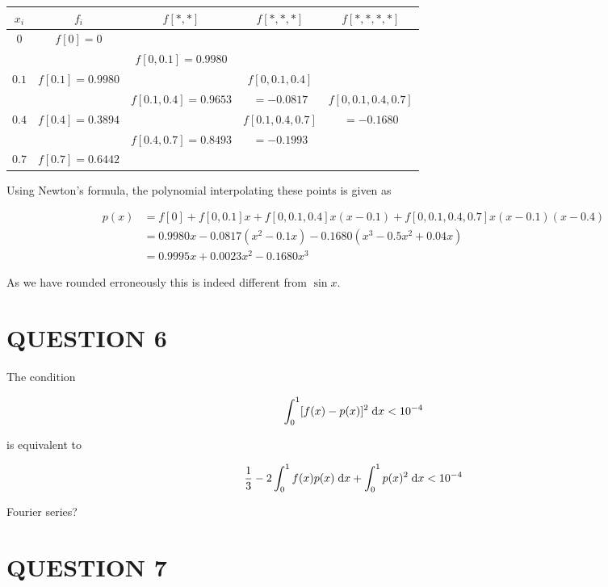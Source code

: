 \documentclass[a4paper]{article}
\begin{document}
\begin{center}
	\begin{tabular}{ccccc}
		\toprule
		$x_i$ & $f_i$ & $f[*, *]$ & $f[*, *, *]$ & $f[*,*,*,*]$\\
		\midrule
		$0$ & $f[0] = 0$\\
		& & $f[0, 0.1] = 0.9980$\\
		$0.1$ & $f[0.1] = 0.9980$ & & $f[0, 0.1, 0.4] $ \\
		& & $f[0.1, 0.4] = 0.9653 $ & $ = -0.0817 $ & $f[0,0.1,0.4,0.7] $ \\
		$0.4$ & $f[0.4] = 0.3894$ & & $f[0.1, 0.4, 0.7] $ & $ = - 0.1680 $  \\
		& & $f[0.4, 0.7] = 0.8493$ & $ = -0.1993 $ \\
		$0.7$ & $f[0.7] = 0.6442$ & \\
		\bottomrule
	\end{tabular}
\end{center}

Using Newton's formula, the polynomial interpolating these points is given as

\begin{align*}
p(x) & = f[0] + f[0,0.1]x + f[0,0.1,0.4]x(x-0.1) + f[0,0.1,0.4,0.7]x(x-0.1)(x-0.4)  \\
& = 0.9980 x -0.0817(x^2 -0.1x) - 0.1680(x^{3} -0.5x^{2}  + 0.04x)\\
& = 0.9995 x + 0.0023 x^2 - 0.1680 x^{3}
\end{align*}

As we have rounded erroneously this is indeed different from $ \sin x $. 



\section{QUESTION 6}

The condition 

\[ \int_{0}^{1} [ f(x) - p(x)]^{2} \; \mathrm{d} x  < 10^{-4} \]

is equivalent to

\[ \frac{1}{3} - 2 \int_{0}^{1} f(x)p(x) \; \mathrm{d} x + \int_{0}^{1} p(x)^{2} \; \mathrm{d} x < 10^{-4} \]

Fourier series?






\section{QUESTION 7}
\end{document}
